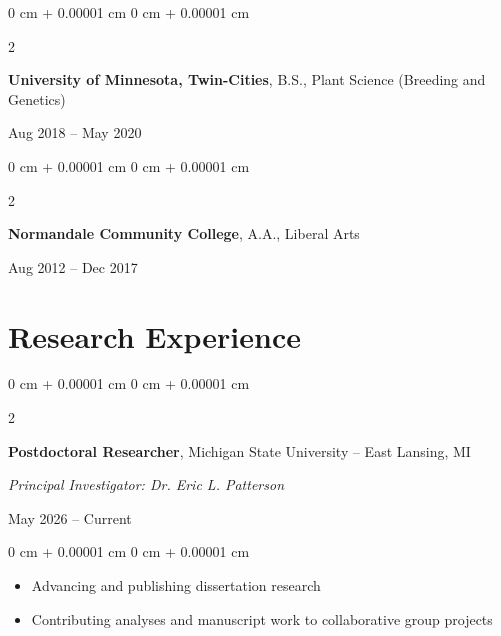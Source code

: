 \documentclass[10pt, letterpaper]{article}
\newenvironment{highlights}{
    \begin{itemize}[
        topsep=0.10 cm,
        parsep=0.10 cm,
        partopsep=0pt,
        itemsep=0pt,
        leftmargin=0 cm + 10pt
    ]
}{
    \end{itemize}
} %
\newenvironment{onecolentry}{
    \begin{adjustwidth}{
        0 cm + 0.00001 cm
    }{
        0 cm + 0.00001 cm
    }
}{
    \end{adjustwidth}
} %
\newenvironment{twocolentry}[2][]{
    \onecolentry
    \def\secondColumn{#2}
    \setcolumnwidth{\fill, 4.5 cm}
    \begin{paracol}{2}
}{
    \switchcolumn \raggedleft \secondColumn
    \end{paracol}
    \endonecolentry
} %
\begin{document}
        \vspace{0.2 cm}
        

        \begin{twocolentry}{
            Aug 2018 – May 2020
            }
            \textbf{University of Minnesota, Twin-Cities}, B.S., Plant Science (Breeding and Genetics)
        \end{twocolentry}


        \vspace{0.2 cm}
        

        \begin{twocolentry}{
            Aug 2012 – Dec 2017
            }
            \textbf{Normandale Community College}, A.A., Liberal Arts
        \end{twocolentry}



    
    \section{Research Experience}




        \begin{samepage}        
            \begin{twocolentry}{
                May 2026 – Current
                }
                \textbf{Postdoctoral Researcher}, Michigan State University -- East Lansing, MI
                
                \vspace{0.05 cm}

                \textit{Principal Investigator: Dr. Eric L. Patterson}
            \end{twocolentry}
        \end{samepage}
        
        \vspace{0.10 cm}
        
        \begin{onecolentry}
            \begin{highlights}
                \item Advancing and publishing dissertation research
                \item Contributing analyses and manuscript work to collaborative group projects
                
            \end{highlights}
        \end{onecolentry}
\end{document}
